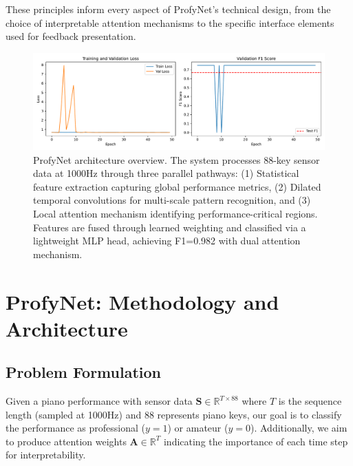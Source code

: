 \documentclass[sigconf,review,anonymous]{acmart}
\begin{document}
These principles inform every aspect of ProfyNet's technical design, from the choice of interpretable attention mechanisms to the specific interface elements used for feedback presentation.

\begin{figure}[h]
  \centering
  \includegraphics[width=0.8\linewidth]{figures/architecture_overview.pdf}
  \caption{ProfyNet architecture overview. The system processes 88-key sensor data at 1000Hz through three parallel pathways: (1) Statistical feature extraction capturing global performance metrics, (2) Dilated temporal convolutions for multi-scale pattern recognition, and (3) Local attention mechanism identifying performance-critical regions. Features are fused through learned weighting and classified via a lightweight MLP head, achieving F1=0.982 with dual attention mechanism.}
  \label{fig:architecture_overview}
\end{figure}

\section{ProfyNet: Methodology and Architecture}

\subsection{Problem Formulation}

Given a piano performance with sensor data $\mathbf{S} \in \mathbb{R}^{T \times 88}$ where $T$ is the sequence length (sampled at 1000Hz) and 88 represents piano keys, our goal is to classify the performance as professional ($y=1$) or amateur ($y=0$). Additionally, we aim to produce attention weights $\mathbf{A} \in \mathbb{R}^{T}$ indicating the importance of each time step for interpretability.
\end{document}
